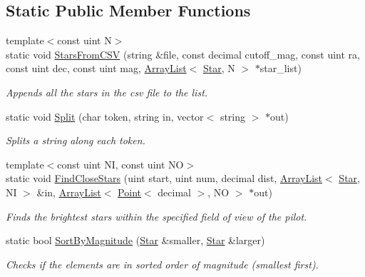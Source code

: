 \subsection*{Static Public Member Functions}
\begin{DoxyCompactItemize}
\item 
{\footnotesize template$<$const uint N$>$ }\\static void \hyperlink{classstar__tracker_1_1Star_a88467ca924b874aabbed260788018c45}{Stars\+From\+C\+SV} (string \&file, const decimal cutoff\+\_\+mag, const uint ra, const uint dec, const uint mag, \hyperlink{classutil_1_1ArrayList}{Array\+List}$<$ \hyperlink{classstar__tracker_1_1Star}{Star}, N $>$ $\ast$star\+\_\+list)
\begin{DoxyCompactList}\small\item\em Appends all the stars in the csv file to the list. \end{DoxyCompactList}\item 
static void \hyperlink{classstar__tracker_1_1Star_a9b2ed6550ce96db70536a139a815c2df}{Split} (char token, string in, vector$<$ string $>$ $\ast$out)
\begin{DoxyCompactList}\small\item\em Splits a string along each token. \end{DoxyCompactList}\item 
{\footnotesize template$<$const uint NI, const uint NO$>$ }\\static void \hyperlink{classstar__tracker_1_1Star_aa5776ee07b44d63cfe6464d74e7ffe78}{Find\+Close\+Stars} (uint start, uint num, decimal dist, \hyperlink{classutil_1_1ArrayList}{Array\+List}$<$ \hyperlink{classstar__tracker_1_1Star}{Star}, NI $>$ \&in, \hyperlink{classutil_1_1ArrayList}{Array\+List}$<$ \hyperlink{classutil_1_1Point}{Point}$<$ decimal $>$, NO $>$ $\ast$out)
\begin{DoxyCompactList}\small\item\em Finds the brightest stars within the specified field of view of the pilot. \end{DoxyCompactList}\item 
static bool \hyperlink{classstar__tracker_1_1Star_af06e825ada5958c0c3f60bb118867fac}{Sort\+By\+Magnitude} (\hyperlink{classstar__tracker_1_1Star}{Star} \&smaller, \hyperlink{classstar__tracker_1_1Star}{Star} \&larger)
\begin{DoxyCompactList}\small\item\em Checks if the elements are in sorted order of magnitude (smallest first). \end{DoxyCompactList}\end{DoxyCompactItemize}
